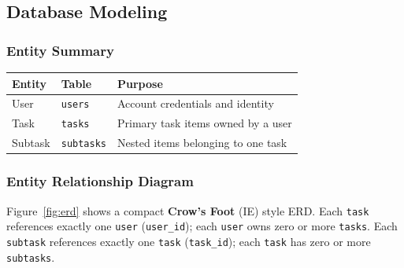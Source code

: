 \subsection{Database Modeling}\label{sec:database}

\subsubsection{Entity Summary}
\begin{tabularx}{\textwidth}{@{} l l X @{}}
\toprule
\textbf{Entity} & \textbf{Table} & \textbf{Purpose} \\
\midrule
User    & \texttt{users}    & Account credentials and identity \\
Task    & \texttt{tasks}    & Primary task items owned by a user \\
Subtask & \texttt{subtasks} & Nested items belonging to one task \\
\bottomrule
\end{tabularx}

\subsubsection{Entity Relationship Diagram}
Figure~\ref{fig:erd} shows a compact \textbf{Crow's Foot} (IE) style ERD.
Each \texttt{task} references exactly one \texttt{user} (\texttt{user\_id});
each \texttt{user} owns zero or more \texttt{tasks}.
Each \texttt{subtask} references exactly one \texttt{task} (\texttt{task\_id});
each \texttt{task} has zero or more \texttt{subtasks}.

